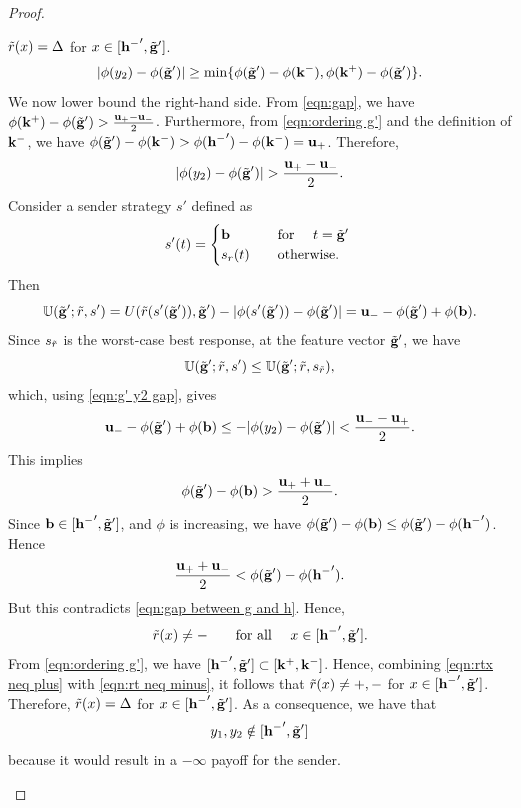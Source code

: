 \begin{proof}
\begin{claims}{$\tilde{r}(x) = \Delta$ for $x \in [\mathbf{h^{-}}', \tilde{\mathbf{g}}']$.}
	\[
	|\phi(y_2) - \phi(\tilde{\mathbf{g}}')| \geq \min\{\phi(\tilde{\mathbf{g}}') - \phi(\mathbf{k}^-), \phi(\mathbf{k}^+) - \phi(\tilde{\mathbf{g}}')\}.
	\]
	We now lower bound the right-hand side. From \eqref{eqn:gap}, we have $\phi(\mathbf{k}^+) - \phi(\tilde{\mathbf{g}}') > \frac{\mathbf{u_+} - \mathbf{u_-}}{2}$. Furthermore, from \eqref{eqn:ordering g'}
	and the definition of $\mathbf{k}^-$, we have  $\phi(\tilde{\mathbf{g}}') - \phi(\mathbf{k}^-) > \phi(\mathbf{h^{-}}') - \phi(\mathbf{k}^-) = \mathbf{u_+}$. Therefore,
	\begin{equation}\label{eqn:g' y2 gap}
		|\phi(y_2) - \phi(\tilde{\mathbf{g}}')| > \frac{\mathbf{u_+} - \mathbf{u_-}}{2}.
	\end{equation}
	Consider a sender strategy $s'$ defined as
	\[
	s'(t) = \begin{cases}
		\mathbf{b} & \hbox{\quad for \quad} t = \tilde{\mathbf{g}}' \\
		s_r(t) & \hbox{\quad otherwise.\quad}
	\end{cases}
	\]
	Then
	\[
	\mathbb{U}(\tilde{\mathbf{g}}'; \tilde{r}, s') = U(\tilde{r}(s'(\tilde{\mathbf{g}}')), \tilde{\mathbf{g}}') - |\phi(s'(\tilde{\mathbf{g}}')) - \phi(\tilde{\mathbf{g}}')| = \mathbf{u_-} - \phi(\tilde{\mathbf{g}}') + \phi(\mathbf{b}).
	\]
	Since $s_{\tilde{r}}$ is the worst-case best response, at the feature vector $\tilde{\mathbf{g}}'$, we have
	\[
	\mathbb{U}(\tilde{\mathbf{g}}'; \tilde{r}, s') \leq \mathbb{U}(\tilde{\mathbf{g}}'; \tilde{r}, s_{\tilde{r}}),
	\]
	which, using \eqref{eqn:g' y2 gap}, gives
	\[
	\mathbf{u_-} - \phi(\tilde{\mathbf{g}}') + \phi(\mathbf{b}) \leq  - |\phi(y_2) - \phi(\tilde{\mathbf{g}}')| < \frac{\mathbf{u_-} - \mathbf{u_+}}{2}.
	\]
	This implies
	\[
	\phi(\tilde{\mathbf{g}}') - \phi(\mathbf{b}) > \frac{\mathbf{u_+} + \mathbf{u_-}}{2}.
	\]
	Since $\mathbf{b} \in [\mathbf{h^{-}}', \tilde{\mathbf{g}}']$, and $\phi$ is increasing, we have $\phi(\tilde{\mathbf{g}}') - \phi(\mathbf{b}) \leq \phi(\tilde{\mathbf{g}}') - \phi(\mathbf{h^{-}}')$. Hence
	\[
	\frac{\mathbf{u_+} + \mathbf{u_-}}{2} <  \phi(\tilde{\mathbf{g}}') - \phi(\mathbf{h^{-}}').
	\]
	But this contradicts \eqref{eqn:gap between g and h}. Hence,
	\begin{equation}\label{eqn:rt neq minus}
		\tilde{r}(x) \neq \mathbf{-} \quad \hbox{\quad for all \quad} x \in [\mathbf{h^{-}}', \tilde{\mathbf{g}}'].
	\end{equation}
	From \eqref{eqn:ordering g'}, we have $[\mathbf{h^{-}}', \tilde{\mathbf{g}}'] \subset [\mathbf{k}^+, \mathbf{k}^-]$. Hence, combining \eqref{eqn:rtx neq plus} with \eqref{eqn:rt neq minus}, it follows that $\tilde{r}(x) \neq \mathbf{+}, \mathbf{-}$ for $x \in [\mathbf{h^{-}}', \tilde{\mathbf{g}}']$. Therefore, $\tilde{r}(x) = \Delta$ for $x \in [\mathbf{h^{-}}', \tilde{\mathbf{g}}']$. As a consequence, we have that
	\begin{equation}\label{eqn:y1,y2 not delta}
		y_1, y_2 \notin [\mathbf{h^{-}}', \tilde{\mathbf{g}}']
	\end{equation}
	because it would result in a $-\infty$ payoff for the sender.
\end{claims}



\end{proof}
